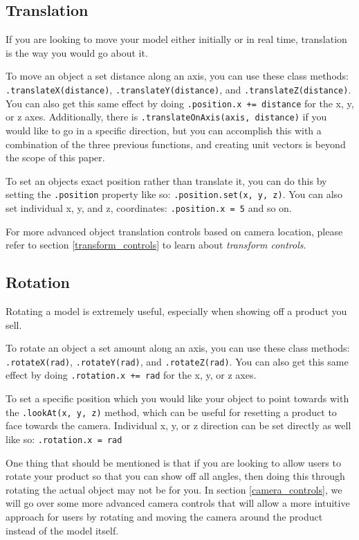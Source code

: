 \documentclass[10pt,final,journal,compsoc]{IEEEtran}
\begin{document}
    \subsection{Translation}
    If you are looking to move your model either initially or in real time, translation is the way you would go about it.
    
    To move an object a set distance along an axis, you can use these class methods: \verb|.translateX(distance)|, \verb|.translateY(distance)|, and \verb|.translateZ(distance)|. You can also get this same effect by doing \verb|.position.x += distance| for the x, y, or z axes. Additionally, there is \verb|.translateOnAxis(axis, distance)| if you would like to go in a specific direction, but you can accomplish this with a combination of the three previous functions, and creating unit vectors is beyond the scope of this paper.
    
    To set an objects exact position rather than translate it, you can do this by setting the \verb|.position| property like so: \verb|.position.set(x, y, z)|. You can also set individual x, y, and z, coordinates: \verb|.position.x = 5| and so on.
    
    For more advanced object translation controls based on camera location, please refer to section \ref{transform_controls} to learn about \textit{transform controls}.
    
    \subsection{Rotation}
    Rotating a model is extremely useful, especially when showing off a product you sell.
    
    To rotate an object a set amount along an axis, you can use these class methods: \verb|.rotateX(rad)|, \verb|.rotateY(rad)|, and \verb|.rotateZ(rad)|. You can also get this same effect by doing \verb|.rotation.x += rad| for the x, y, or z axes.
    
    To set a specific position which you would like your object to point towards with the \verb|.lookAt(x, y, z)| method, which can be useful for resetting a product to face towards the camera. Individual x, y, or z direction can be set directly as well like so: \verb|.rotation.x = rad|
    
    One thing that should be mentioned is that if you are looking to allow users to rotate your product so that you can show off all angles, then doing this through rotating the actual object may not be for you. In section \ref{camera_controls}, we will go over some more advanced camera controls that will allow a more intuitive approach for users by rotating and moving the camera around the product instead of the model itself.
    
\end{document}
